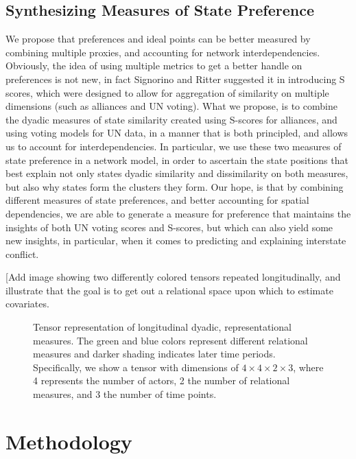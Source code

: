 \subsection*{Synthesizing Measures of State Preference}

We propose that preferences and ideal points can be better measured by combining multiple proxies, and accounting for network interdependencies. Obviously, the idea of using multiple metrics to get a better handle on preferences is not new, in fact Signorino and Ritter suggested it in introducing S scores, which were designed to allow for aggregation of similarity on multiple dimensions (such as alliances and UN voting). What we propose, is to combine the dyadic measures of state similarity created using S-scores for alliances, and using voting models for UN data, in a manner that is both principled, and allows us to account for interdependencies. In particular, we use these two measures of state preference in a network model, in order to ascertain the state positions that best explain not only states dyadic similarity and dissimilarity on both measures, but also why states form the clusters they form. Our hope, is that by combining different measures of state preferences, and better accounting for spatial dependencies, we are able to generate a measure for preference that maintains the insights of both UN voting scores and S-scores, but which can also yield some new insights, in particular, when it comes to predicting and explaining interstate conflict.

[Add image showing two differently colored tensors repeated longitudinally, and illustrate that the goal is to get out a relational space upon which to estimate covariates. 

\begin{figure}[ht]
	\centering
	\resizebox{.5\textwidth}{!}{}
	\caption{Tensor representation of longitudinal dyadic, representational measures. The green and blue colors represent different relational measures and darker shading indicates later time periods. Specifically, we show a tensor with dimensions of $4 \times 4 \times 2 \times 3$, where 4 represents the number of actors, 2 the number of relational measures, and 3 the number of time points.}
	\label{fig:tensViz}
\end{figure}

\section*{Methodology}

